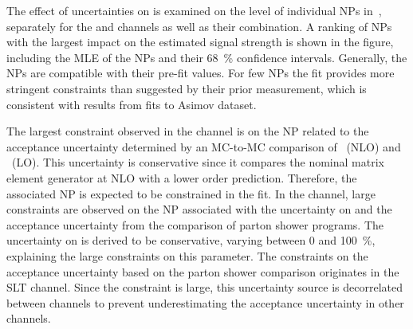 The effect of uncertainties on \muhat is examined on the level of individual NPs
in~, separately for the \hadhad and \lephad
channels as well as their combination. A ranking of NPs with the largest impact
on the estimated signal strength is shown in the figure, including the MLE of
the NPs and their \SI{68}{\percent} confidence intervals. Generally, the NPs are
compatible with their pre-fit values. For few NPs the fit provides more
stringent constraints than suggested by their prior measurement, which is
consistent with results from fits to Asimov dataset.

The largest constraint observed in the \hadhad channel is on the NP related to
the \ZHF acceptance uncertainty determined by an MC-to-MC comparison of
\SHERPA~(NLO) and \MGPY~(LO). This uncertainty is conservative since it compares
the nominal matrix element generator at NLO with a lower order
prediction. Therefore, the associated NP is expected to be constrained in the
fit. In the \lephad channel, large constraints are observed on the NP associated
with the uncertainty on \rqcd and the \ttbar acceptance uncertainty from the
comparison of parton shower programs. The uncertainty on \rqcd is derived to be
conservative, varying \rqcd between 0 and \SI{100}{\percent}, explaining the
large constraints on this parameter.
The constraints on the \ttbar acceptance uncertainty based on the parton shower
comparison originates in the \lephad SLT channel. Since the constraint is large,
this uncertainty source is decorrelated between channels to prevent
underestimating the acceptance uncertainty in other channels.

